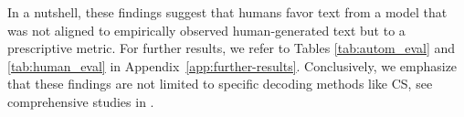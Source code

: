 \documentclass{article}
\theoremstyle{plain}
\theoremstyle{definition}
\theoremstyle{remark}
\begin{document}
In a nutshell, these findings suggest that humans favor text from a model that was not aligned to empirically observed human-generated text but to a prescriptive metric. For further results, we refer to Tables \ref{tab:autom_eval} and \ref{tab:human_eval} in Appendix~\ref{app:further-results}. 
%
Conclusively, we emphasize that these findings are not limited to specific decoding methods like CS, see comprehensive studies in \citet{su2022empiricalstudycontrastivesearch,garces-arias-etal-2024-adaptive,arias2024towards,garces-arias-etal-2025-decoding,GUARD-25}. 


















\end{document}
